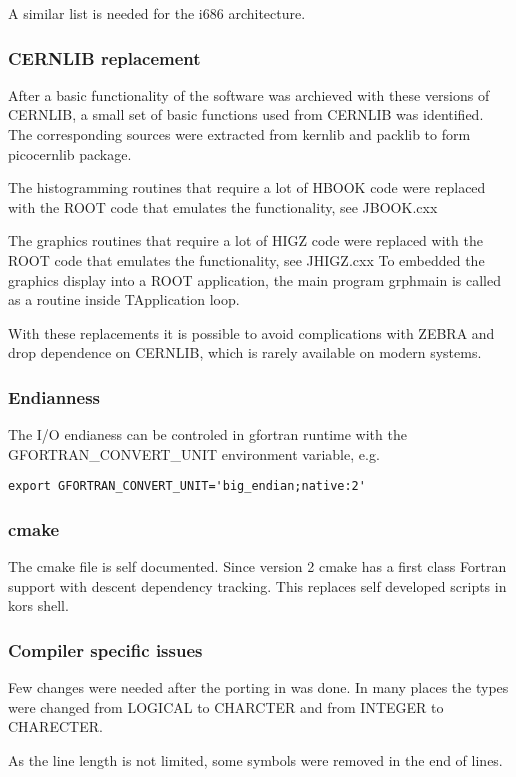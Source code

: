 A similar list is needed for the i686 architecture.

\subsubsection{CERNLIB replacement}
After a basic functionality of the software was archieved with these versions of CERNLIB,
a small set of basic  functions used from CERNLIB 
was identified. The corresponding sources were extracted from kernlib and packlib to form picocernlib package.

The histogramming routines that require a lot of HBOOK code were replaced with the ROOT code that emulates
the functionality, see JBOOK.cxx  

The graphics routines that require a lot of HIGZ code were replaced with the ROOT code that emulates
the functionality, see JHIGZ.cxx To embedded the graphics display into a ROOT application,
the main program grphmain is called as a routine inside TApplication loop.

With these replacements it is possible to avoid complications with ZEBRA and drop dependence on CERNLIB, which is
rarely available on modern systems.

\subsubsection{Endianness}
The I/O endianess  can be controled in gfortran runtime with the 
GFORTRAN\_CONVERT\_UNIT environment variable, e.g.
\begin{verbatim}
export GFORTRAN_CONVERT_UNIT='big_endian;native:2'
\end{verbatim}

\subsubsection{cmake}
The cmake file is self documented.
Since version 2 cmake  has a first class Fortran support with descent dependency tracking.
This replaces self developed scripts in kors shell.

\subsubsection{Compiler specific issues}
Few changes were needed after the porting in   was done.
In many places the types were changed from LOGICAL to CHARCTER
and from INTEGER to CHARECTER.

As the line length is not limited, some symbols were removed in the end of lines.

